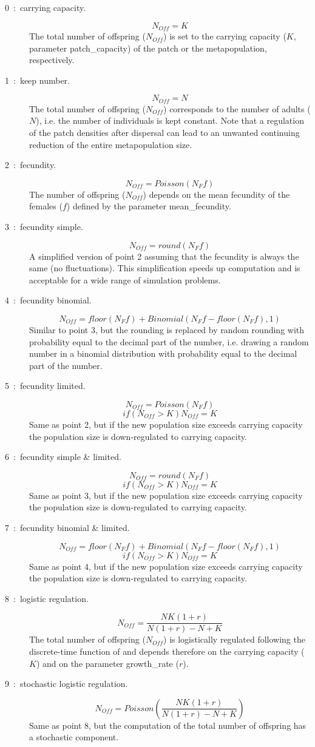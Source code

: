 \documentclass[letterpaper,12pt,oneside]{book}
\begin{document}
\begin{description}
\item [0~:~carrying capacity.]  \[ N_{Off} = K \]
The total number of offspring ($N_{Off}$) is set to the carrying capacity ($K$, parameter \textsf{patch\_capacity}) of the patch or the metapopulation, respectively.
\item [1~:~keep number.] \[ N_{Off} = N \]
The total number of offspring ($N_{Off}$) corresponds to the number of adults ($N$), i.e. the number of individuals is kept constant. Note that a regulation of the patch densities after dispersal can lead to an unwanted continuing reduction of the entire metapopulation size. 
\item [2~:~fecundity.]  \[ N_{Off} = Poisson(N_{F}f) \]
The number of offspring ($N_{Off}$) depends on the mean fecundity of the females ($f$) defined by the parameter \textsf{mean\_fecundity}.
\item [3~:~fecundity simple.] \[ N_{Off} = round(N_{F}f) \]
A simplified version of point 2 assuming that the fecundity is always the same (no fluctuations). This simplification speeds up computation and is acceptable for a wide range of simulation problems.
\item [4~:~fecundity binomial.] \[ N_{Off} = floor(N_{F}f)+Binomial(N_{F}f-floor(N_{F}f),1) \]
Similar to point 3, but the rounding is replaced by random rounding with probability equal to the decimal part of the number, i.e. drawing a random number in a binomial distribution with probability equal to the decimal part of the number.
\item [5~:~fecundity limited.] 
\[ N_{Off}= Poisson(N_{F}f) \]
\[ if(N_{Off}>K) N_{Off}=K \]
Same as point 2, but if the new population size exceeds carrying capacity the population size is down-regulated to carrying capacity.
\item [6~:~fecundity simple \& limited.]
\[ N_{Off}=round(N_{F}f) \]
\[ if(N_{Off}>K) N_{Off}=K \]
Same as point 3, but if the new population size exceeds carrying capacity the population size is down-regulated to carrying capacity.
\item [7~:~fecundity binomial \& limited.]
\[ N_{Off}=floor(N_{F}f)+Binomial(N_{F}f-floor(N_{F}f),1) \]
\[ if(N_{Off}>K) N_{Off}=K \]
Same as point 4, but if the new population size exceeds carrying capacity the population size is down-regulated to carrying capacity.
\item [8~:~logistic regulation.] \[ N_{Off} = \frac{NK(1+r)}{N(1+r)-N+K} \]
The total number of offspring ($N_{Off}$) is logistically regulated following the discrete-time function of \citet{Beverton_1957} and depends therefore on the carrying capacity ($K$) and on the parameter \textsf{growth\_rate} ($r$). 
\item [9~:~stochastic logistic regulation.] \[ N_{Off} = Poisson\left(\frac{NK(1+r)}{N(1+r)-N+K}\right) \] 
Same as point 8, but the computation of the total number of offspring has a stochastic component.
\end{description}
\end{document}
